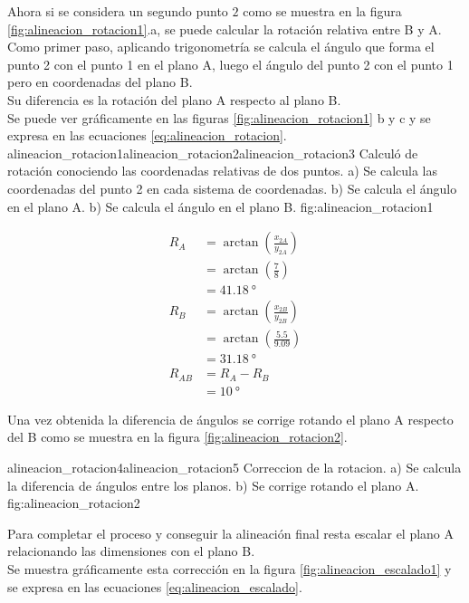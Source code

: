          Ahora si se considera un segundo punto $2$ como se muestra en la figura \ref{fig:alineacion_rotacion1}.a, se puede calcular la rotación relativa entre B y A.\\
         Como primer paso, aplicando trigonometría se calcula el ángulo que forma el punto 2 con el punto 1 en el plano A, luego el ángulo del punto 2 con el punto 1 pero en coordenadas del plano B.\\
         Su diferencia es la rotación del plano A respecto al plano B.\\
         Se puede ver gráficamente en las figuras \ref{fig:alineacion_rotacion1} b y c y se expresa en las ecuaciones \ref{eq:alineacion_rotacion}.
         {alineacion_rotacion1}{alineacion_rotacion2}{alineacion_rotacion3}
         {Calculó de rotación conociendo las coordenadas relativas de dos puntos. a) Se calcula las coordenadas del punto 2 en cada sistema de coordenadas. b) Se calcula el ángulo en el plano A. b) Se calcula el ángulo en el plano B.}
         {fig:alineacion_rotacion1}


         \begin{equation}
            \begin{aligned}
               R_A &= \arctan(\frac{x_{2A}}{y_{2A}}) \\
                  &= \arctan(\frac{7}{8}) \\
                  &= \SI{41.18}{\degree}\\
              R_B &= \arctan(\frac{x_{2B}}{y_{2B}})\\
                  &= \arctan(\frac{5.5}{9.09}) \\
                  &= \SI{31.18}{\degree}\\
           R_{AB} &= R_A - R_B\\
                      &= \SI{10}{\degree}
            \end{aligned}
            \label{eq:alineacion_rotacion}
         \end{equation}

         Una vez obtenida la diferencia de ángulos se corrige rotando el plano A respecto del B como se muestra en la figura \ref{fig:alineacion_rotacion2}.

         {alineacion_rotacion4}{alineacion_rotacion5}
         {Correccion de la rotacion. a) Se calcula la diferencia de ángulos entre los planos. b) Se corrige rotando el plano A.}
         {fig:alineacion_rotacion2}

         Para completar el proceso y conseguir la alineación final resta escalar el plano A relacionando las dimensiones con el plano B.\\
         Se muestra gráficamente esta corrección en la figura \ref{fig:alineacion_escalado1} y se expresa en las ecuaciones  \ref{eq:alineacion_escalado}.


